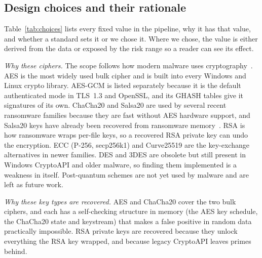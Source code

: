 \subsection{Design choices and their rationale}
\label{sec:choices}
Table~\ref{tab:choices} lists every fixed value in the pipeline, why it has that value, and whether a standard
sets it or we chose it. Where we chose, the value is either derived from the data or exposed by the risk range
so a reader can see its effect.

\textit{Why these ciphers.} The scope follows how modern malware uses cryptography~\cite{oz2022survey}.
AES is the most widely used bulk cipher and is built into every Windows and Linux crypto library. AES-GCM is
listed separately because it is the default authenticated mode in TLS~1.3 and OpenSSL, and its GHASH tables give
it signatures of its own. ChaCha20 and Salsa20 are used by several recent ransomware families because they are
fast without AES hardware support, and Salsa20 keys have already been recovered from ransomware
memory~\cite{babiano2023evaluation}. RSA is how ransomware wraps per-file keys, so a recovered RSA private key
can undo the encryption. ECC (P-256, secp256k1) and Curve25519 are the key-exchange alternatives in newer
families. DES and 3DES are obsolete but still present in Windows CryptoAPI and older malware, so finding them
implemented is a weakness in itself. Post-quantum schemes are not yet used by malware and are left as future work.

\textit{Why these key types are recovered.} AES and ChaCha20 cover the two bulk ciphers, and each has a
self-checking structure in memory (the AES key schedule, the ChaCha20 state and keystream) that makes a false
positive in random data practically impossible. RSA private keys are recovered because they unlock everything
the RSA key wrapped, and because legacy CryptoAPI leaves primes behind.


